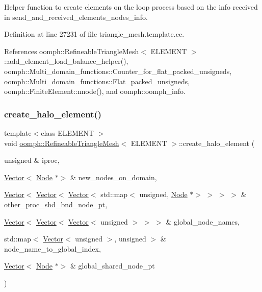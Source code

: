 Helper function to create elements on the loop process based on the info received in send\+\_\+and\+\_\+received\+\_\+elements\+\_\+nodes\+\_\+info. 



Definition at line 27231 of file triangle\+\_\+mesh.\+template.\+cc.



References oomph\+::\+Refineable\+Triangle\+Mesh$<$ E\+L\+E\+M\+E\+N\+T $>$\+::add\+\_\+element\+\_\+load\+\_\+balance\+\_\+helper(), oomph\+::\+Multi\+\_\+domain\+\_\+functions\+::\+Counter\+\_\+for\+\_\+flat\+\_\+packed\+\_\+unsigneds, oomph\+::\+Multi\+\_\+domain\+\_\+functions\+::\+Flat\+\_\+packed\+\_\+unsigneds, oomph\+::\+Finite\+Element\+::nnode(), and oomph\+::oomph\+\_\+info.

\mbox{\label{classoomph_1_1RefineableTriangleMesh_aac106ac220a5e794234ca75378371342}} 
\subsubsection{\texorpdfstring{create\+\_\+halo\+\_\+element()}{create\_halo\_element()}}
{\footnotesize\ttfamily template$<$class E\+L\+E\+M\+E\+NT $>$ \\
void \hyperlink{classoomph_1_1RefineableTriangleMesh}{oomph\+::\+Refineable\+Triangle\+Mesh}$<$ E\+L\+E\+M\+E\+NT $>$\+::create\+\_\+halo\+\_\+element (\begin{DoxyParamCaption}\item[{unsigned \&}]{iproc,  }\item[{\hyperlink{classoomph_1_1Vector}{Vector}$<$ \hyperlink{classoomph_1_1Node}{Node} $\ast$$>$ \&}]{new\+\_\+nodes\+\_\+on\+\_\+domain,  }\item[{\hyperlink{classoomph_1_1Vector}{Vector}$<$ \hyperlink{classoomph_1_1Vector}{Vector}$<$ \hyperlink{classoomph_1_1Vector}{Vector}$<$ std\+::map$<$ unsigned, \hyperlink{classoomph_1_1Node}{Node} $\ast$$>$ $>$ $>$ $>$ \&}]{other\+\_\+proc\+\_\+shd\+\_\+bnd\+\_\+node\+\_\+pt,  }\item[{\hyperlink{classoomph_1_1Vector}{Vector}$<$ \hyperlink{classoomph_1_1Vector}{Vector}$<$ \hyperlink{classoomph_1_1Vector}{Vector}$<$ unsigned $>$ $>$ $>$ \&}]{global\+\_\+node\+\_\+names,  }\item[{std\+::map$<$ \hyperlink{classoomph_1_1Vector}{Vector}$<$ unsigned $>$, unsigned $>$ \&}]{node\+\_\+name\+\_\+to\+\_\+global\+\_\+index,  }\item[{\hyperlink{classoomph_1_1Vector}{Vector}$<$ \hyperlink{classoomph_1_1Node}{Node} $\ast$$>$ \&}]{global\+\_\+shared\+\_\+node\+\_\+pt }\end{DoxyParamCaption})\hspace{0.3cm}{\ttfamily [protected]}}



